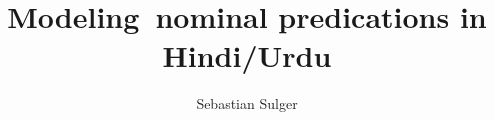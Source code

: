 \author{Sebastian Sulger}
\title{Modeling~nominal predications in Hindi/Urdu}
\renewcommand{\lsSeries}{eotmsig}
\renewcommand{\lsSeriesNumber}{}
